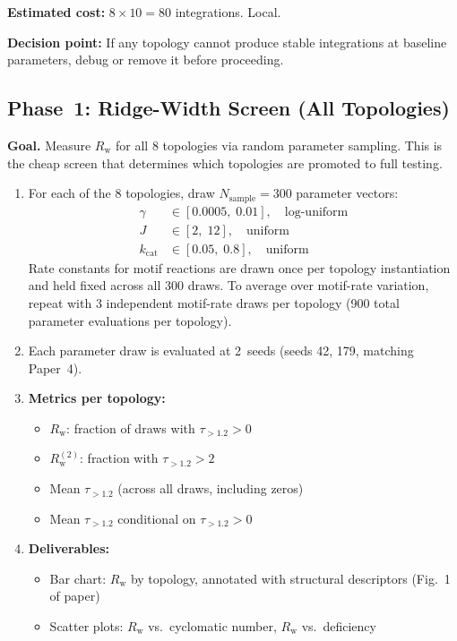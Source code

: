 \documentclass[aps,prl,twocolumn,superscriptaddress,floatfix]{revtex4-2}
\newcommand{\tauexp}{\tau_{>1.2}}
\newcommand{\kcat}{k_{\mathrm{cat}}}
\newcommand{\Rw}{R_{\mathrm{w}}}
\begin{document}
\textbf{Estimated cost:} $8 \times 10 = 80$ integrations.  Local.

\textbf{Decision point:}  If any topology cannot produce stable
integrations at baseline parameters, debug or remove it before
proceeding.

\subsection{Phase~1: Ridge-Width Screen (All Topologies)}
\label{sec:phase1}

\textbf{Goal.}  Measure $\Rw$ for all 8 topologies via random
parameter sampling.  This is the cheap screen that determines
which topologies are promoted to full testing.

\begin{enumerate}[label=1.\arabic*]
  \item For each of the 8 topologies, draw
    $N_{\mathrm{sample}} = 300$ parameter vectors:
    \begin{align}
      \gamma &\in [0.0005,\; 0.01], \quad \text{log-uniform} \\
      J      &\in [2,\; 12], \quad \text{uniform} \\
      \kcat  &\in [0.05,\; 0.8], \quad \text{uniform}
    \end{align}
    Rate constants for motif reactions are drawn once per
    topology instantiation and held fixed across all 300 draws.
    To average over motif-rate variation, repeat with 3
    independent motif-rate draws per topology (900 total
    parameter evaluations per topology).

  \item Each parameter draw is evaluated at 2~seeds
    (seeds 42, 179, matching Paper~4).

  \item \textbf{Metrics per topology:}
    \begin{itemize}
      \item $\Rw$: fraction of draws with $\tauexp > 0$
      \item $\Rw^{(2)}$: fraction with $\tauexp > 2$
      \item Mean $\tauexp$ (across all draws, including zeros)
      \item Mean $\tauexp$ conditional on $\tauexp > 0$
    \end{itemize}

  \item \textbf{Deliverables:}
    \begin{itemize}
      \item Bar chart: $\Rw$ by topology, annotated with
        structural descriptors (Fig.~1 of paper)
      \item Scatter plots: $\Rw$ vs.\ cyclomatic number,
        $\Rw$ vs.\ deficiency
    \end{itemize}
\end{enumerate}
\end{document}
